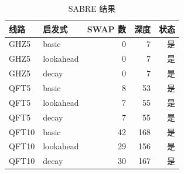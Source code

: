 \begin{table}[H]
  \centering
  \caption{SABRE 结果}
  \label{tab:quick-matrix}
  \begin{tabular}{llrrr}
    \toprule
    线路 & 启发式 & SWAP 数 & 深度 & 状态 \\
    \midrule
    GHZ5 & basic & 0 & 7 & 是 \\
    GHZ5 & lookahead & 0 & 7 & 是 \\
    GHZ5 & decay & 0 & 7 & 是 \\
    QFT5 & basic & 8 & 53 & 是 \\
    QFT5 & lookahead & 7 & 55 & 是 \\
    QFT5 & decay & 7 & 55 & 是 \\
    QFT10 & basic & 42 & 168 & 是 \\
    QFT10 & lookahead & 29 & 156 & 是 \\
    QFT10 & decay & 30 & 167 & 是 \\
    \bottomrule
  \end{tabular}
\end{table}
